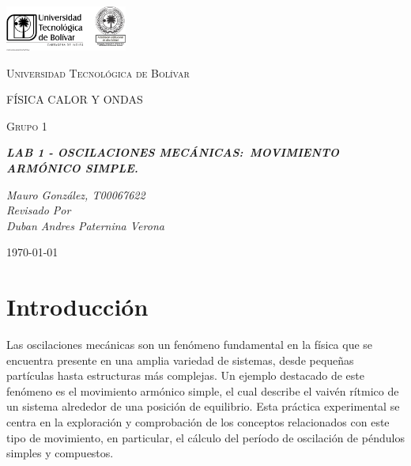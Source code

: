 \documentclass[twocolumn, 12pt]{article}
\begin{document}
\begin{titlepage}
    \centering
    \includegraphics[width=0.3\textwidth]{Images/logo_utb.png}\par\vspace{1cm}
    {\scshape\LARGE Universidad Tecnológica de Bolívar \par}
    \vspace{1cm}

    {\scshape\Large FÍSICA CALOR Y ONDAS \par}
    \vspace{.2cm}

    {\scshape\Large Grupo 1 \par}
    \vspace{1cm}
    \slshape {\Large \bfseries{}LAB 1 - OSCILACIONES MECÁNICAS:\@{}~MOVIMIENTO ARMÓNICO SIMPLE.\\}
    \vspace{4cm}

    \slshape {\itshape{} Mauro González, T00067622 \\}
    \vfill
    Revisado Por \\
    Duban Andres Paternina Verona\\
    {\large \today\par}
\end{titlepage}

\section{Introducción}

Las oscilaciones mecánicas son un fenómeno fundamental en
la física que se encuentra presente en una amplia variedad
de sistemas, desde pequeñas partículas hasta estructuras
más complejas. Un ejemplo destacado de este fenómeno es el
movimiento armónico simple, el cual describe el vaivén
rítmico de un sistema alrededor de una posición de
equilibrio. Esta práctica experimental se centra en la
exploración y comprobación de los conceptos relacionados
con este tipo de movimiento, en particular, el cálculo del
período de oscilación de péndulos simples y compuestos.
\end{document}
